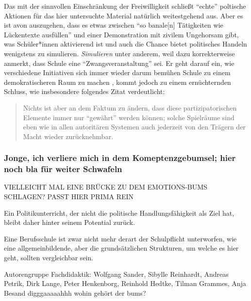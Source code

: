 Das mit der sinnvollen Einschränkung der Freiwilligkeit schließt \enquote{echte} poltische Aktionen für das hier untersuchte Material natürlich weitestgehend aus. Aber es ist avon auszugehen, dass es etwas zwischen \enquote{so banale[n] Tätigkeiten wie Lückentexte ausfüllen} \autocite[466]{Nonnenmacher2010} und einer Demonstration mit zivilem Ungehorsam gibt, was Schüler*innen aktivierend ist und auch die Chance bietet politisches Handeln wenigstens zu simulieren. 
\emph{Simulieren} unter anderem, weil \textcite[467]{Nonnenmacher2010} dazu korrekterweise anmerkt, dass Schule eine \enquote{Zwangsveranstaltung} sei. Er geht darauf ein, wie verschiedene Initiativen sich immer wieder darum bemühen Schule zu einem demokratischeren Raum zu machen \autocite[467-469]{Nonnenmacher2010}, kommt jedoch zu einem ernüchternden Schluss, wie insbesondere folgendes Zitat verdeutlicht:
\begin{quote}
    Nichts ist aber an dem Faktum zu ändern, dass diese partizipatorischen Elemente immer nur \enquote{gewährt} werden können; solche Spielräume sind eben wie in allen autoritären Systemen auch jederzeit von den Trägern der Macht wieder zurücknehmbar. 

    \autocite[468]{Nonnenmacher2010}
\end{quote}


\subsubsection{Jonge, ich verliere mich in dem Komeptenzgebumsel; hier noch bla für weiter Schwafeln}
VIELLEICHT MAL EINE BRÜCKE ZU DEM EMOTIONS-BUMS SCHLAGEN? PASST HIER PRIMA REIN



Ein Politikunterricht, der nicht die politische Handlungsfähigkeit als Ziel hat, bleibt daher hinter seinem Potential zurück.



Eine Berufsschule ist zwar nicht mehr derart der Schulpflicht unterworfen, wie eine allgemeinbildende, aber die grundsätzlichen Strukturen, um welche es hier geht, sollten vergleichbar sein.

 \textcite[467-469]{Nonnenmacher2010}

Autorengruppe Fachdidaktik:
Wolfgang Sander, Sibylle Reinhardt, Andreas Petrik, Dirk Lange, Peter Henkenborg, Reinhold Hedtke, Tilman Grammes, Anja Besand
\autocite[]{Sander.2016}
digggaaaaahhh wohin gehört der bums?\autocite[]{Sander.2016}

